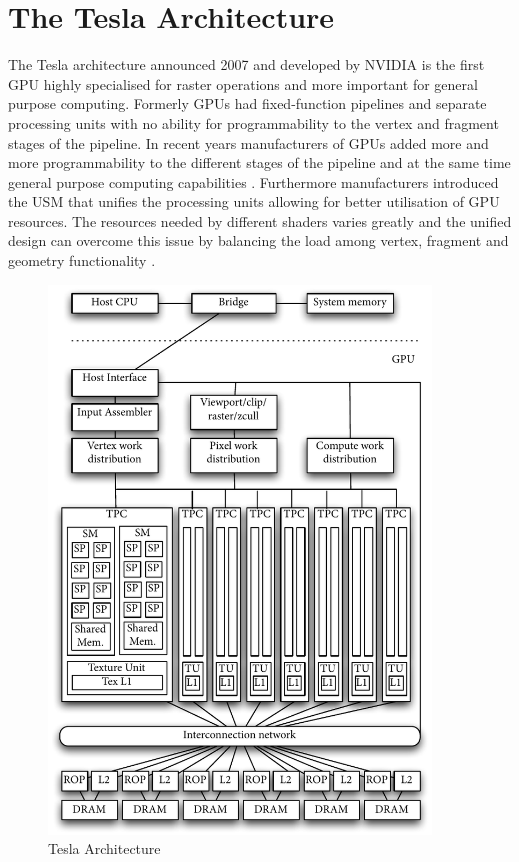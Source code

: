 \section{The Tesla Architecture}%
\label{sub:the_tesla_architecture} 
The Tesla architecture announced 2007 and developed by \gls{NVIDIA} is the first
\gls{GPU} highly specialised for raster operations and more important
for general purpose computing. Formerly \glspl{GPU} had fixed-function
pipelines and separate processing units with no ability for programmability to
the vertex and fragment stages of the pipeline. In recent years manufacturers of
\glspl{GPU} added more and more programmability to the different stages
of the pipeline and at the same time general purpose computing capabilities
\citep{citeulike:3844545}. Furthermore manufacturers introduced the  \gls{USM} 
that unifies the processing units allowing for better
utilisation of  \gls{GPU} resources. The resources needed by different
shaders varies greatly and the unified design can overcome this issue by
balancing the load among vertex, fragment and geometry functionality
\citep{citeulike:3145468}.

\begin{figure}[ht]
\centering
\includegraphics[width=4in]{gfx/tesla_architecture} 
\caption{Tesla Architecture} 
\label{fig:tesla_architecture} 
\end{figure} 

